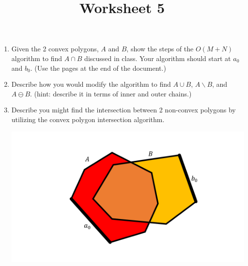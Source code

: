 \documentclass[a4paper,12pt]{article}
\title{Worksheet 5}
\begin{document}
\maketitle

\worksheetGroundRules

\worksheetSubmission

\assignmentInstructions

\begin{enumerate}

\item Given the 2 convex polygons, $A$ and $B$, show the steps of the $O(M+N)$ algorithm to find $A \cap B$ discussed in class. Your algorithm should start at $a_0$ and $b_0$. (Use the pages at the end of the document.)
\item Describe how you would modify the algorithm to find $A \cup B$, $A \backslash B$, and $A \ominus B$. (hint: describe it in terms of inner and outer chains.)
\item Describe you might find the intersection between 2 non-convex polygons by utilizing the convex polygon intersection algorithm.


\begin{center}
\includegraphics[width=0.75\linewidth]{../images/worksheet2b.pdf}
\end{center}


\end{enumerate}

\newpage
\end{document}
